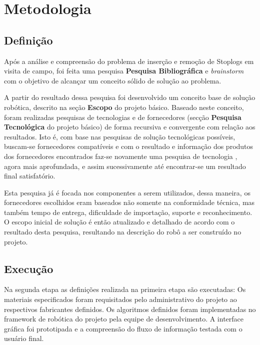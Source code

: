 
\setcounter{secnumdepth}{3}
\section{Metodologia}
\label{metodologia}

\subsection{Definição}  
Após a análise e compreensão do problema de inserção e remoção de Stoplogs em visita de campo, foi feita uma pesquisa
\textbf{Pesquisa Bibliográfica} e \emph{brainstorm} com o objetivo de alcançar um conceito sólido de solução ao problema. 

A partir do resultado dessa pesquisa foi desenvolvido um conceito base de solução robótica, descrito na seção {\bf Escopo} do projeto básico. Baseado neste conceito, foram realizadas pesquisas de tecnologias e de fornecedores (secção  {\bf Pesquisa Tecnológica} do projeto básico) de forma recursiva e convergente com relação aos resultados. Isto
é, com base nas pesquisas de solução tecnológicas possíveis, buscam-se fornecedores compatíveis e com o
resultado e informação dos produtos dos fornecedores encontrados faz-se
novamente uma pesquisa de tecnologia	, agora mais aprofundada, e assim sucessivamente
até encontrar-se um resultado final satisfatório. 

Esta pesquisa já é focada nos
componentes a serem utilizados, dessa maneira, os fornecedores escolhidos eram
baseados não somente na conformidade técnica, mas também tempo de entrega,
dificuldade de importação, suporte e reconhecimento. O escopo inicial de solução
é então atualizado e detalhado de acordo com o resultado desta pesquisa, resultando na descrição do robô a ser construído no projeto.

\subsection{Execução}
Na segunda etapa as definições realizada na primeira etapa são executadas: 
Os materiais especificados foram requisitados pelo administrativo do projeto ao respectivos fabricantes definidos.
Os algoritmos definidos foram implementadas no framework de robótica do projeto pela equipe de desenvolvimento.
A interface gráfica foi prototipada e a compreensão do fluxo de informação testada com o usuário final.  

